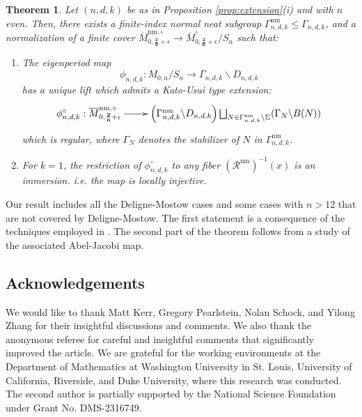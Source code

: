 \documentclass[12pt, letterpaper]{amsart}
\theoremstyle{plain}
\newtheorem{theorem}{Theorem}[section]
\theoremstyle{definition}
\begin{document}
\begin{theorem}\label{thm:KU}
Let $(n,d,k)$ be as in Proposition \ref{prop:extension}(i) and with $n$ even. Then, there exists a finite-index normal neat subgroup $\Gamma^{\mathrm{nm}}_{n,d,k}\leq \Gamma_{n,d,k}$, and a normalization of a finite cover $\overline{M}^{\mathrm{nm},\circ}_{0,\mathbf{\frac{2}{n}} + \epsilon} \longrightarrow \overline{M}_{0,\mathbf{\frac{2}{n}} + \epsilon}^{\circ}/S_n$ such that:
\begin{enumerate}
    \item  The eigenperiod map
    $$
    \phi_{n,d,k} :M_{0,n}/S_n \longrightarrow 
    \Gamma_{n,d,k}\backslash D_{n,d,k}
    $$
    has a unique lift which admits a Kato-Usui type extension:
    \begin{align*}
    \xymatrix{
    \phi^{\circ}_{n,d,k}:   \overline{M}^{\mathrm{nm},\circ}_{0,\mathbf{\frac{2}{n}} + \epsilon}
    \ar[r]& 
    \left( \Gamma^{\mathrm{nm}}_{n,d,k}\backslash D_{n,d,k} \right) 
    \bigsqcup_{N\in \Gamma^{\mathrm{nm}}_{n,d,k}\backslash \Sigma}(\Gamma_N\backslash B(N))
    }
    \end{align*}
which is regular, where $\Gamma_N$ denotes the stabilizer of $N$ in $\Gamma^{\mathrm{nm}}_{n,d,k}$.
    \item For $k=1$, the restriction of $\phi^{\circ}_{n,d,k}$ to any fiber $\left( \mathcal{R}^{\mathrm{nm}} \right)^{-1}(x)$ is an immersion.
    i.e. the map is locally injective. 
\end{enumerate}
\end{theorem}
Our result includes all the Deligne-Mostow cases \cite{gallardo2021geometric} and some cases with $n>12$ that are not covered by Deligne-Mostow. The first statement is a consequence of the techniques employed in \cite[Sec. 3.3]{gallardo2021geometric}. The second part of the theorem follows from a study of the associated Abel-Jacobi map.


\subsection*{Acknowledgements}
We would like to thank Matt Kerr, Gregory Pearlstein, Nolan Schock, and Yilong Zhang for their insightful discussions and comments. We also thank the anonymous referee for careful and insightful comments that significantly improved the article. We are grateful for the working environments at the Department of Mathematics at Washington University in St. Louis, University of California, Riverside, and  Duke University, where this research was conducted.  
The second author is partially supported by the National Science Foundation under Grant No. DMS-2316749.
\end{document}
